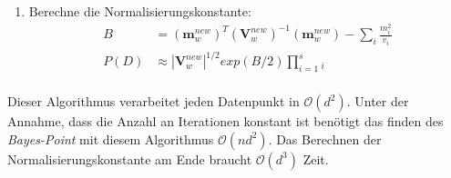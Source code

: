 \documentclass[12pt,a4paper]{scrartcl}
\numberwithin{equation}{section}
\begin{document}
{\begin{enumerate}
\begin{enumerate}
    \begin{equation}
    \begin{split}
     \mathbf{V}_w \mathbf{x}_i &= ( \mathbf{V}_w^{new} \mathbf{x}_i ) \frac{ v_i }{ v_i - \mathbf{x}_i \mathbf{V}_w^{new} \mathbf{x}_i } \\
     \mathbf{x}_i \mathbf{V}_w \mathbf{x}_i &= (\frac{1}{\mathbf{x}_i \mathbf{V}_w^{new} \mathbf{x}_i} - \frac{1}{v_i})^{-1} \\
     \end{split}
    \end{equation}
    \item Berechne mittels ADF $(\mathbf{m}_w^{new}, \mathbf{V}_w^{new}, Z_i)$ aus $(\mathbf{m}_w, \mathbf{V}_w)$ neu.
    \item Aktualisiere $t_i'$: 
    \begin{equation}
     \begin{split}
      v_i &= \mathbf{x}_i^T \mathbf{V}_w \mathbf{x}_i ( \frac{1}{\alpha_i \mathbf{x}_i^T \mathbf{m}_w^{new}} -1 )  \\
      m_i &= \mathbf{x}_i^T \mathbf{m}_w + (v_i + \mathbf{x}_i^{T} \mathbf{V}_w \mathbf{x}_i) \alpha_i \\
      s_i &= Z_i \frac{|\mathbf{V}_i + \mathbf{V}_w|^{1/2}}{|\mathbf{V}_i|^{1/2}} exp(\frac{1}{2}(\mathbf{m}_i \mathbf{m}_w)^T) (\mathbf{V}_i + \mathbf{V}_w)^{-1} (\mathbf{m}_i - \mathbf{m}_w^))\\
      &= Z_i \sqrt{1 + v_i^{-1} \mathbf{x}_i^T \mathbf{V}_w \mathbf{x}_i} exp(\frac{1}{2} \frac{\mathbf{x}_i^T \mathbf{V}_w \mathbf{x}_i}{\mathbf{x}_i^T \mathbf{m}_w^{new}} \alpha_i)\\
      \end{split}
    \end{equation}
   \end{enumerate}
   \item Berechne die Normalisierungskonstante: 
   \begin{equation}
    \begin{split}
      B &= (\mathbf{m}_w^{new})^T (\mathbf{V}_w^{new})^{-1} (\mathbf{m}_w^{new}) - \sum_i \frac{m_i^2}{v_i} \\
      P(D) &\approx |\mathbf{V}_w^{new}|^{1/2} exp(B/2) \prod_{i = 1}^ s_i \\
     \end{split}
   \end{equation}
  \end{enumerate}

  Dieser Algorithmus verarbeitet jeden Datenpunkt in $\mathcal{O}(d^2)$. Unter der Annahme, dass die Anzahl 
  an Iterationen konstant ist benötigt das finden des \textit{Bayes-Point} mit diesem Algorithmus
   $\mathcal{O}(nd^2)$. Das Berechnen der Normalisierungskonstante am Ende braucht  $\mathcal{O}(d^3)$ Zeit. 

}
\end{document}
